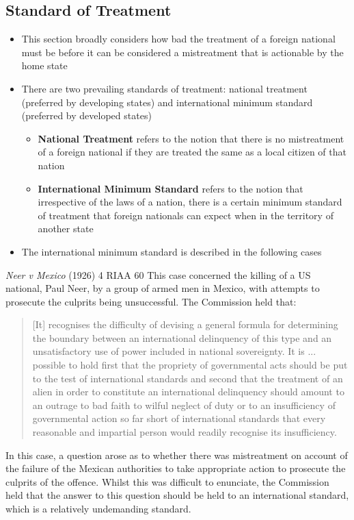 \subsection{Standard of Treatment}
\begin{itemize}
    \item This section broadly considers how bad the treatment of a foreign national must be before it can be considered a mistreatment that is actionable by the home state
    \item There are two prevailing standards of treatment: national treatment (preferred by developing states) and international minimum standard (preferred by developed states)
    \begin{itemize}
        \item \textbf{National Treatment} refers to the notion that there is no mistreatment of a foreign national if they are treated the same as a local citizen of that nation
        \item \textbf{International Minimum Standard} refers to the notion that irrespective of the laws of a nation, there is a certain minimum standard of treatment that foreign nationals can expect when in the territory of another state
    \end{itemize}
    \item The international minimum standard is described in the following cases
\end{itemize}

\begin{casedetails}{\textit{Neer v Mexico} (1926) 4 RIAA 60}
    \flushleft
    This case concerned the killing of a US national, Paul Neer, by a group of armed men in Mexico, with attempts to prosecute the culprits being unsuccessful. The Commission held that:

    \begin{quote}
        [It] recognises the difficulty of devising a general formula for determining the boundary between an international delinquency of this type and an unsatisfactory use of power included in national sovereignty. It is ... possible to hold first that the propriety of governmental acts should be put to the test of international standards and second that the treatment of an alien in order to constitute an international delinquency should amount to an outrage to bad faith to wilful neglect of duty or to an insufficiency of governmental action so far short of international standards that every reasonable and impartial person would readily recognise its insufficiency.
    \end{quote}

    In this case, a question arose as to whether there was mistreatment on account of the failure of the Mexican authorities to take appropriate action to prosecute the culprits of the offence. Whilst this was difficult to enunciate, the Commission held that the answer to this question should be held to an international standard, which is a relatively undemanding standard.
\end{casedetails}


